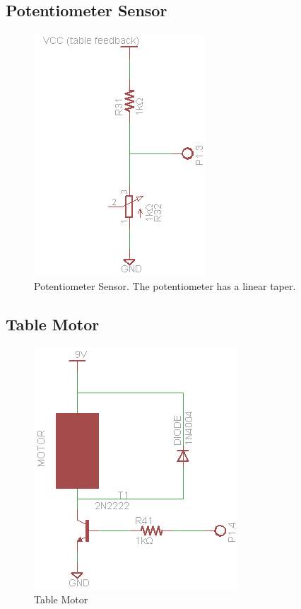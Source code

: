 \documentclass[a4paper, 11pt]{article}
\begin{document}
	\subsection{Potentiometer Sensor}
	\begin{figure}[!ht]
		\centering
		\includegraphics{proposal-images/potentiometer-sensor}
		\caption{Potentiometer Sensor.  The potentiometer has a linear taper.}
	\end{figure}
\newpage
	\subsection{Table Motor}
	\begin{figure}[!ht]
		\centering
		\includegraphics{proposal-images/table-motor}
		\caption{Table Motor}
	\end{figure}
\end{document}

